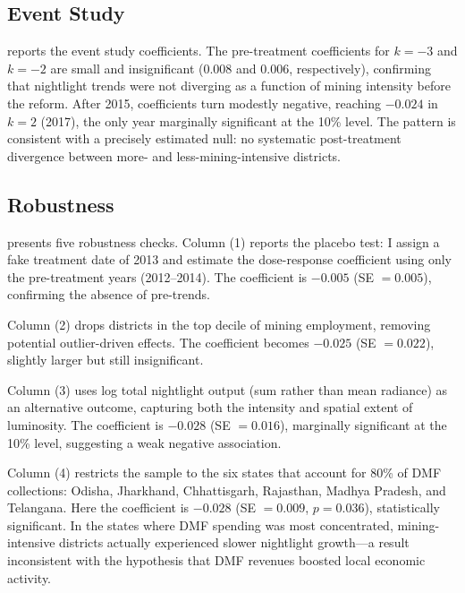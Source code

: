 \documentclass[12pt]{article}
\begin{document}


\subsection{Event Study}

 reports the event study coefficients. The pre-treatment coefficients for $k = -3$ and $k = -2$ are small and insignificant ($0.008$ and $0.006$, respectively), confirming that nightlight trends were not diverging as a function of mining intensity before the reform. After 2015, coefficients turn modestly negative, reaching $-0.024$ in $k = 2$ (2017), the only year marginally significant at the 10\% level. The pattern is consistent with a precisely estimated null: no systematic post-treatment divergence between more- and less-mining-intensive districts.



\subsection{Robustness}

 presents five robustness checks. Column (1) reports the placebo test: I assign a fake treatment date of 2013 and estimate the dose-response coefficient using only the pre-treatment years (2012--2014). The coefficient is $-0.005$ (SE $= 0.005$), confirming the absence of pre-trends.

Column (2) drops districts in the top decile of mining employment, removing potential outlier-driven effects. The coefficient becomes $-0.025$ (SE $= 0.022$), slightly larger but still insignificant.

Column (3) uses log total nightlight output (sum rather than mean radiance) as an alternative outcome, capturing both the intensity and spatial extent of luminosity. The coefficient is $-0.028$ (SE $= 0.016$), marginally significant at the 10\% level, suggesting a weak negative association.

Column (4) restricts the sample to the six states that account for 80\% of DMF collections: Odisha, Jharkhand, Chhattisgarh, Rajasthan, Madhya Pradesh, and Telangana. Here the coefficient is $-0.028$ (SE $= 0.009$, $p = 0.036$), statistically significant. In the states where DMF spending was most concentrated, mining-intensive districts actually experienced slower nightlight growth---a result inconsistent with the hypothesis that DMF revenues boosted local economic activity.
\end{document}

